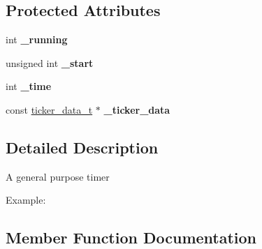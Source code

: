 \subsection*{Protected Attributes}
\begin{DoxyCompactItemize}
\item 
int {\bfseries \+\_\+running}\hypertarget{classmbed_1_1_timer_a4d3e749708de44d051e90d49d58ac4b4}{}\label{classmbed_1_1_timer_a4d3e749708de44d051e90d49d58ac4b4}

\item 
unsigned int {\bfseries \+\_\+start}\hypertarget{classmbed_1_1_timer_a5a1304be7ee97acd4a532be2ca565fcc}{}\label{classmbed_1_1_timer_a5a1304be7ee97acd4a532be2ca565fcc}

\item 
int {\bfseries \+\_\+time}\hypertarget{classmbed_1_1_timer_a63b5673835238bd5a6ba309a55712d78}{}\label{classmbed_1_1_timer_a63b5673835238bd5a6ba309a55712d78}

\item 
const \hyperlink{structticker__data__t}{ticker\+\_\+data\+\_\+t} $\ast$ {\bfseries \+\_\+ticker\+\_\+data}\hypertarget{classmbed_1_1_timer_a7e3f16c5747dd07da0980f6107d4e7de}{}\label{classmbed_1_1_timer_a7e3f16c5747dd07da0980f6107d4e7de}

\end{DoxyCompactItemize}


\subsection{Detailed Description}
A general purpose timer

Example\+: 
 

\subsection{Member Function Documentation}
